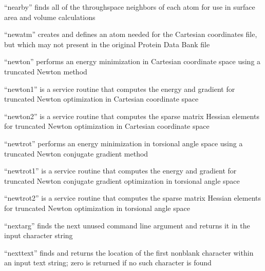 \documentclass[letterpaper,11pt,english]{sphinxmanual}
\begin{document}

“nearby” finds all of the through\sphinxhyphen{}space neighbors of each
atom for use in surface area and volume calculations



“newatm” creates and defines an atom needed for the
Cartesian coordinates file, but which may not present
in the original Protein Data Bank file


“newton” performs an energy minimization in Cartesian
coordinate space using a truncated Newton method


“newton1” is a service routine that computes the energy
and gradient for truncated Newton optimization in Cartesian
coordinate space


“newton2” is a service routine that computes the sparse
matrix Hessian elements for truncated Newton optimization
in Cartesian coordinate space


“newtrot” performs an energy minimization in torsional angle
space using a truncated Newton conjugate gradient method


“newtrot1” is a service routine that computes the energy
and gradient for truncated Newton conjugate gradient
optimization in torsional angle space


“newtrot2” is a service routine that computes the sparse
matrix Hessian elements for truncated Newton optimization
in torsional angle space


“nextarg” finds the next unused command line argument
and returns it in the input character string


“nexttext” finds and returns the location of the first
non\sphinxhyphen{}blank character within an input text string; zero
is returned if no such character is found
\end{document}
